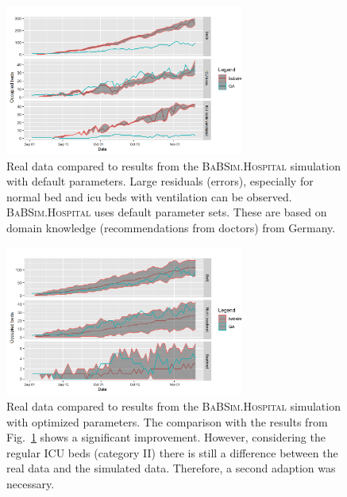 \documentclass[conference]{IEEEtran}
\newcommand{\babsimhospital}{\textsc{BaBSim.Hospital}\xspace}
\begin{document}
\begin{figure}
  \centering
   \includegraphics[width=0.7\textwidth]{default.png}
  \caption{Real data compared to results from the \babsimhospital simulation with default parameters. Large residuals (errors), especially for normal bed and icu beds with ventilation can be observed.
   \babsimhospital uses default parameter sets. These are based on domain knowledge (recommendations from doctors) from Germany. }
\label{fig:default}
\end{figure}
\begin{figure}
    \centering
    \includegraphics[width=0.7\textwidth]{optimized01.png}
    \caption{Real data compared to results from the \babsimhospital simulation with optimized parameters. The comparison with the results from Fig.~\ref{fig:default} shows a significant improvement. However, considering the regular \gls{ICU} beds (category II) there is still a difference between the real data and the simulated data. Therefore, a second adaption was necessary.
  }
\label{fig:optimized01}
\end{figure}
\end{document}
